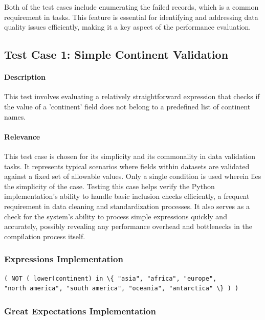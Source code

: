 Both of the test cases include enumerating the failed records, which is a common requirement in  tasks. This feature is essential for identifying and addressing data quality issues efficiently, making it a key aspect of the performance evaluation.

\subsection{Test Case 1: Simple Continent Validation}

\paragraph{Description} This test involves evaluating a relatively straightforward expression that checks if the value of a 'continent' field does not belong to a predefined list of continent names. 

\paragraph{Relevance} This test case is chosen for its simplicity and its commonality in data validation tasks. It represents typical scenarios where fields within datasets are validated against a fixed set of allowable values.  Only a single condition is used wherein lies the simplicity of the case. Testing this case helps verify the Python implementation’s ability to handle basic inclusion checks efficiently, a frequent requirement in data cleaning and standardization processes. It also serves as a check for the system’s ability to process simple expressions quickly and accurately, possibly revealing any performance overhead and bottlenecks in the compilation process itself.

\subsubsection{Expressions Implementation}

\begin{verbatim}
( NOT ( lower(continent) in \{ "asia", "africa", "europe", 
"north america", "south america", "oceania", "antarctica" \} ) )
\end{verbatim}

\subsubsection{Great Expectations Implementation}

